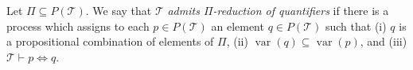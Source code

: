 Let $\Pi \subseteq P(\mathcal{T})$. We say that $\mathcal{T}$ \emph{admits $\Pi$-reduction of quantifiers} if there is a process which assigns to each $p \in P(\mathcal{T})$ an element $q \in P(\mathcal{T})$ such that (i) $q$ is a propositional combination of elements of $\Pi$, (ii) $\operatorname{var}(q) \subseteq \operatorname{var}(p)$, and (iii) $\mathcal{T} \vdash p \Leftrightarrow q$.
